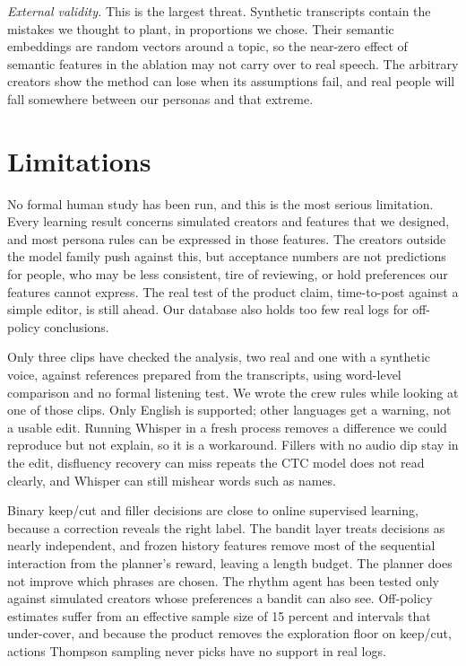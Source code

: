 \documentclass{ieeeaccess}
\begin{document}
\textit{External validity.} This is the largest threat. Synthetic transcripts contain the mistakes we thought to plant, in proportions we chose. Their semantic embeddings are random vectors around a topic, so the near-zero effect of semantic features in the ablation may not carry over to real speech. The arbitrary creators show the method can lose when its assumptions fail, and real people will fall somewhere between our personas and that extreme.

\section{Limitations}
\label{sec:limitations}
No formal human study has been run, and this is the most serious limitation. Every learning result concerns simulated creators and features that we designed, and most persona rules can be expressed in those features. The creators outside the model family push against this, but acceptance numbers are not predictions for people, who may be less consistent, tire of reviewing, or hold preferences our features cannot express. The real test of the product claim, time-to-post against a simple editor, is still ahead. Our database also holds too few real logs for off-policy conclusions.

Only three clips have checked the analysis, two real and one with a synthetic voice, against references prepared from the transcripts, using word-level comparison and no formal listening test. We wrote the crew rules while looking at one of those clips. Only English is supported; other languages get a warning, not a usable edit. Running Whisper in a fresh process removes a difference we could reproduce but not explain, so it is a workaround. Fillers with no audio dip stay in the edit, disfluency recovery can miss repeats the CTC model does not read clearly, and Whisper can still mishear words such as names.

Binary keep/cut and filler decisions are close to online supervised learning, because a correction reveals the right label. The bandit layer treats decisions as nearly independent, and frozen history features remove most of the sequential interaction from the planner's reward, leaving a length budget. The planner does not improve which phrases are chosen. The rhythm agent has been tested only against simulated creators whose preferences a bandit can also see. Off-policy estimates suffer from an effective sample size of 15 percent and intervals that under-cover, and because the product removes the exploration floor on keep/cut, actions Thompson sampling never picks have no support in real logs.
\end{document}
